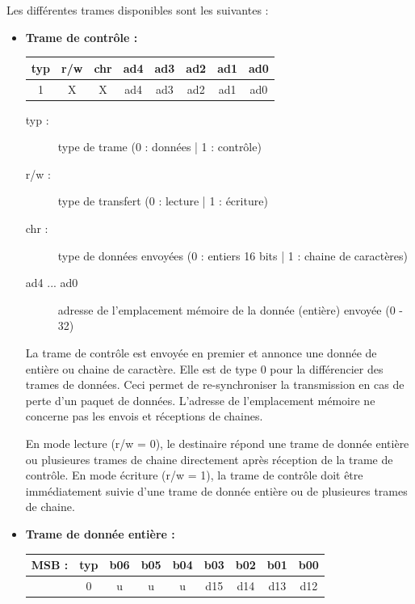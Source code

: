 \documentclass[11pt, french]{article} %
\begin{document}
\medskip
\noindent
Les différentes trames disponibles sont les suivantes :
\medskip
\begin{itemize}
	\item\textbf{ Trame de contrôle :} \\

		\begin{tabular} {|c|c|c|c|c|c|c|c|}
			\hline
			\textbf{typ} & \textbf{r/w} & \textbf{chr} & \textbf{ad4} & \textbf{ad3} & \textbf{ad2} & \textbf{ad1} & \textbf{ad0}\\
			\hline
			1 & X &  X &  ad4 &  ad3 &  ad2 &  ad1 &  ad0 \\ \hline
		\end{tabular}

		\begin{description}
			\item[typ :] type de trame (0 : données | 1 : contrôle)
			\item[r/w :] type de transfert (0 : lecture | 1 : écriture)
			\item[chr :] type de données envoyées (0 : entiers 16 bits | 1 : chaine de caractères)
			\item[ad4 ... ad0] adresse de l'emplacement mémoire de la donnée (entière) envoyée (0 - 32)
		\end{description}

		La trame de contrôle est envoyée en premier et annonce une donnée de entière ou chaine de caractère. Elle est de type 0 pour la différencier des trames de données. Ceci permet de re-synchroniser la transmission en cas de perte d'un paquet de données. L'adresse de l'emplacement mémoire ne concerne pas les envois et réceptions de chaines.

\medskip
		En mode lecture (r/w = 0), le destinaire répond une trame de donnée entière ou plusieures trames de chaine directement après réception de la trame de contrôle. En mode écriture (r/w = 1), la trame de contrôle doit être immédiatement suivie d'une trame de donnée entière ou de plusieures trames de chaine.


	\medskip
	\item\textbf{ Trame de donnée entière :} \\

		\begin{tabular} {|c|c|c|c|c|c|c|c|c|}
			\hline
			\textbf{MSB :} & \textbf{typ} & \textbf{b06} & \textbf{b05} & \textbf{b04} & \textbf{b03} & \textbf{b02} & \textbf{b01} & \textbf{b00}\\
			\hline
			 & 0 & u &  u &  u &  d15 &  d14 &  d13 &  d12 \\ \hline
		\end{tabular}


\end{itemize}
\end{document}
